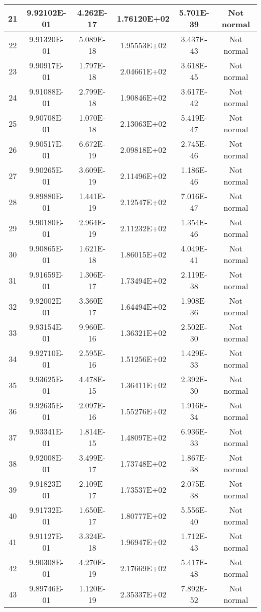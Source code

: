 \begin{table}[h]
\begin{tabular}{|c|c|c|c|c|c|}
		21 & 9.92102E-01 & 4.262E-17 & 1.76120E+02 & 5.701E-39 & Not normal\\\hline
		22 & 9.91320E-01 & 5.089E-18 & 1.95553E+02 & 3.437E-43 & Not normal\\\hline
		23 & 9.90917E-01 & 1.797E-18 & 2.04661E+02 & 3.618E-45 & Not normal\\\hline
		24 & 9.91088E-01 & 2.799E-18 & 1.90846E+02 & 3.617E-42 & Not normal\\\hline
		25 & 9.90708E-01 & 1.070E-18 & 2.13063E+02 & 5.419E-47 & Not normal\\\hline
		26 & 9.90517E-01 & 6.672E-19 & 2.09818E+02 & 2.745E-46 & Not normal\\\hline
		27 & 9.90265E-01 & 3.609E-19 & 2.11496E+02 & 1.186E-46 & Not normal\\\hline
		28 & 9.89880E-01 & 1.441E-19 & 2.12547E+02 & 7.016E-47 & Not normal\\\hline
		29 & 9.90180E-01 & 2.964E-19 & 2.11232E+02 & 1.354E-46 & Not normal\\\hline
		30 & 9.90865E-01 & 1.621E-18 & 1.86015E+02 & 4.049E-41 & Not normal\\\hline
		31 & 9.91659E-01 & 1.306E-17 & 1.73494E+02 & 2.119E-38 & Not normal\\\hline
		32 & 9.92002E-01 & 3.360E-17 & 1.64494E+02 & 1.908E-36 & Not normal\\\hline
		33 & 9.93154E-01 & 9.960E-16 & 1.36321E+02 & 2.502E-30 & Not normal\\\hline
		34 & 9.92710E-01 & 2.595E-16 & 1.51256E+02 & 1.429E-33 & Not normal\\\hline
		35 & 9.93625E-01 & 4.478E-15 & 1.36411E+02 & 2.392E-30 & Not normal\\\hline
		36 & 9.92635E-01 & 2.097E-16 & 1.55276E+02 & 1.916E-34 & Not normal\\\hline
		37 & 9.93341E-01 & 1.814E-15 & 1.48097E+02 & 6.936E-33 & Not normal\\\hline
		38 & 9.92008E-01 & 3.499E-17 & 1.73748E+02 & 1.867E-38 & Not normal\\\hline
		39 & 9.91823E-01 & 2.109E-17 & 1.73537E+02 & 2.075E-38 & Not normal\\\hline
		40 & 9.91732E-01 & 1.650E-17 & 1.80777E+02 & 5.556E-40 & Not normal\\\hline
		41 & 9.91127E-01 & 3.324E-18 & 1.96947E+02 & 1.712E-43 & Not normal\\\hline
		42 & 9.90308E-01 & 4.270E-19 & 2.17669E+02 & 5.417E-48 & Not normal\\\hline
		43 & 9.89746E-01 & 1.120E-19 & 2.35337E+02 & 7.892E-52 & Not normal\\\hline

\end{tabular}
\end{table}
